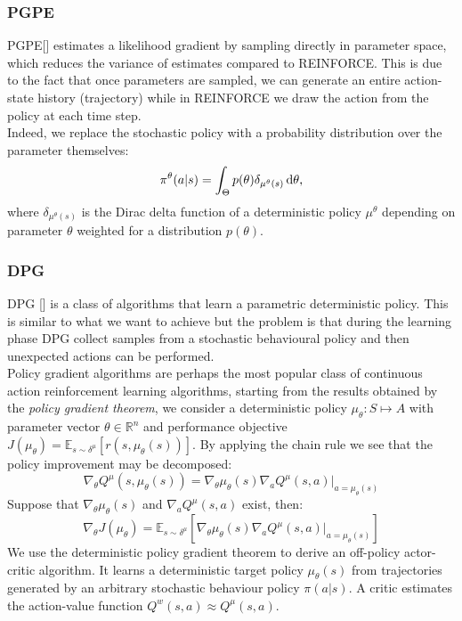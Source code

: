 \subsubsection{PGPE}
\acf{PGPE}[\citet{sehnke2008PolicyGradient}] estimates a likelihood gradient by sampling directly in parameter space, which reduces the variance of estimates compared to REINFORCE. This is due to the fact that once parameters are sampled, we can generate an entire action-state history (trajectory) while in REINFORCE we draw the action from the policy at each time step.\\
\newline
Indeed, we replace the stochastic policy with a probability distribution over the parameter themselves:
$$ \pi^{\theta}(a|s) = \int_{\Theta} p(\theta) \delta_{\mu^{\theta}(s)}\,\mathrm{d} \theta,
$$
where $\delta_{\mu^{\theta}(s)}$ is the Dirac delta function of a deterministic policy $\mu^{\theta}$ depending on parameter $\theta$ weighted for a distribution $p(\theta)$.

\subsubsection{DPG}
\acf{DPG} [\citet{article}] is a class of algorithms that learn a parametric deterministic policy. This is similar to what we want to achieve but the problem is that during the learning phase \ac{DPG} collect samples from a stochastic behavioural policy and then unexpected actions can be performed.\\
\newline
Policy gradient algorithms are perhaps the most popular class of continuous action reinforcement learning algorithms, starting from the results obtained by the \emph{policy gradient theorem}, we consider a deterministic policy $\mu_{\theta}: S \mapsto A$ with parameter vector $\theta \in \mathbb{R}^n$ and performance objective $J(\mu_{\theta}) = \mathbb{E}_{s \sim \delta^{\mu}}[r(s, \mu_{\theta}(s))]$. 
By applying the chain rule we see that the policy improvement may be decomposed:
$$
\nabla_{\theta} Q^{\mu}(s, \mu_{\theta}(s)) = \nabla_{\theta}\mu_{\theta}(s)\nabla_a Q^{\mu}(s, a)|_{a=\mu_{\theta}(s)}
$$
Suppose that $\nabla_{\theta}\mu_{\theta}(s)$ and $\nabla_aQ^{\mu}(s,a)$ exist, then:
$$
\nabla_{\theta}J(\mu_{\theta}) = \mathbb{E}_{s \sim \delta^{\mu}} [\nabla_{\theta} \mu_{\theta} (s) \nabla_a Q^{\mu}(s,a)|_{a = \mu_{\theta} (s)}]
$$
We use the deterministic policy gradient theorem to derive an off-policy actor-critic algorithm. It learns a deterministic target policy $\mu_{\theta}(s)$ from trajectories generated by an arbitrary stochastic behaviour policy $\pi(a|s)$. A critic estimates the action-value function $Q^w(s,a) \approx Q^{\mu}(s,a)$. 


